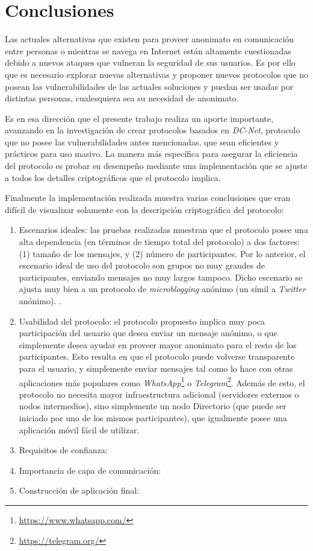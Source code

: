 \chapter{Conclusiones}

Las actuales alternativas que existen para proveer anonimato en comunicación 
entre personas o mientras se navega en Internet están altamente cuestionadas 
debido a nuevos ataques que vulneran la seguridad de sus usuarios. Es por ello 
que es necesario explorar nuevas alternativas y proponer nuevos protocolos 
que no posean las vulnerabilidades de las actuales soluciones y puedan ser usadas 
por distintas personas, cualesquiera sea su necesidad de anonimato.

Es en esa dirección que el presente trabajo realiza un aporte importante, avanzando 
en la investigación de crear protocolos basados en \emph{DC-Net}, protocolo que no 
posee las vulnerabilidades antes mencionadas, que sean eficientes y prácticos para uso masivo. 
La manera más específica para asegurar la eficiencia del protocolo es probar su 
desempeño mediante una implementación que se ajuste a todos los detalles criptográficos 
que el protocolo implica.

Finalmente la implementación realizada muestra varias conclusiones que eran difícil 
de visualizar solamente con la descripción criptográfica del protocolo:

\begin{enumerate}
    \item Escenarios ideales: las pruebas realizadas muestran que el protocolo posee una 
    alta dependencia (en términos de tiempo total del protocolo) a dos factores: 
    (1) tamaño de los mensajes, y (2) número de participantes. Por lo anterior, el escenario 
    ideal de uso del protocolo son grupos no muy grandes de participantes, enviando mensajes 
    no muy largos tampoco. Dicho escenario se ajusta muy bien a un protocolo de 
    \emph{microblogging} anónimo (un símil a \emph{Twitter} anónimo). .
    \item Usabilidad del protocolo: el protocolo propuesto implica muy poca participación 
    del usuario que desea enviar un mensaje anónimo, o que simplemente desea ayudar en proveer 
    mayor anonimato para el resto de los participantes. Esto resulta en que el protocolo 
    puede volverse transparente para el usuario, y simplemente enviar mensajes tal como lo hace 
    con otras aplicaciones más populares como \emph{WhatsApp}\footnote{\url{https://www.whatsapp.com/}} o \emph{Telegram}\footnote{\url{https://telegram.org/}}. Además de esto, el protocolo 
    no necesita mayor infraestructura adicional (servidores externos o nodos intermedios), sino 
    simplemente un nodo Directorio (que puede ser iniciado por uno de los mismos participantes), 
    que igualmente posee una aplicación móvil fácil de utilizar.
    \item Requisitos de confianza: 
    \item Importancia de capa de comunicación:
    \item Construcción de aplicación final:
\end{enumerate}

